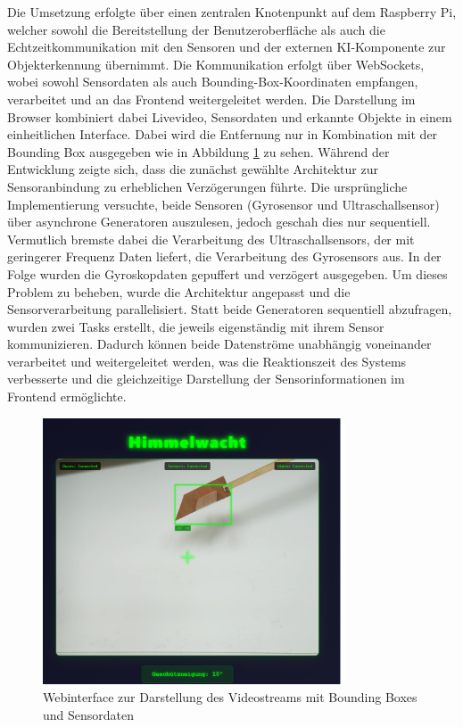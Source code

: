 Die Umsetzung erfolgte über einen zentralen Knotenpunkt auf dem Raspberry Pi, welcher sowohl die Bereitstellung der Benutzeroberfläche als auch die Echtzeitkommunikation mit den Sensoren und der externen KI-Komponente zur Objekterkennung übernimmt. Die Kommunikation erfolgt über WebSockets, wobei sowohl Sensordaten als auch Bounding-Box-Koordinaten empfangen, verarbeitet und an das Frontend weitergeleitet werden. Die Darstellung im Browser kombiniert dabei Livevideo, Sensordaten und erkannte Objekte in einem einheitlichen Interface. 
Dabei wird die Entfernung nur in Kombination mit der Bounding Box ausgegeben wie in Abbildung \ref{fig:webserver} zu sehen.
Während der Entwicklung zeigte sich, dass die zunächst gewählte Architektur zur Sensoranbindung zu erheblichen Verzögerungen führte. Die ursprüngliche Implementierung versuchte, beide Sensoren (Gyrosensor und Ultraschallsensor) über asynchrone Generatoren auszulesen, jedoch geschah dies nur sequentiell. Vermutlich bremste dabei die Verarbeitung des Ultraschallsensors, der mit geringerer Frequenz Daten liefert, die Verarbeitung des Gyrosensors aus. In der Folge wurden die Gyroskopdaten gepuffert und verzögert ausgegeben.
Um dieses Problem zu beheben, wurde die Architektur angepasst und die Sensorverarbeitung parallelisiert. Statt beide Generatoren sequentiell abzufragen, wurden zwei Tasks erstellt, die jeweils eigenständig mit ihrem Sensor kommunizieren. Dadurch können beide Datenströme unabhängig voneinander verarbeitet und weitergeleitet werden, was die Reaktionszeit des Systems verbesserte und die gleichzeitige Darstellung der Sensorinformationen im Frontend ermöglichte.
\begin{figure}[H]
    \begin{center}
        \includegraphics[width=0.8\textwidth]{images/Webserver.png}
        \caption{Webinterface zur Darstellung des Videostreams mit Bounding Boxes und Sensordaten}
        \label{fig:webserver}
    \end{center}
\end{figure}